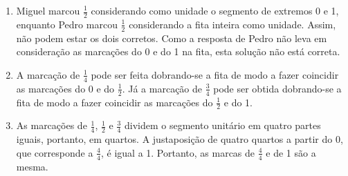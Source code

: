 \begin{atividade}
\solucao
\begin{enumerate}
    \item Miguel marcou $\frac{1}{2}$ considerando como unidade o segmento de extremos 0 e 1, enquanto Pedro marcou $\frac{1}{2}$ considerando a fita inteira como unidade. Assim, não podem estar os dois corretos. Como a resposta de Pedro não leva em consideração as marcações do 0 e do 1 na fita, esta solução não está correta.
\begin{center}
\end{center}
    \item       A marcação de       $\frac{1}{4}$       pode ser feita dobrando-se a fita de modo a fazer coincidir as marcações do 0 e do        $\frac{1}{2}$. Já a marcação de       $\frac{3}{4}$     pode ser obtida dobrando-se a fita de modo a fazer coincidir as marcações do       $\frac{1}{2}$       e do 1.

\begin{center}
\end{center}

    \item       As marcações de       $\frac{1}{4}$,        $\frac{1}{2}$       e       $\frac{3}{4}$       dividem o segmento unitário em quatro partes iguais, portanto, em quartos. A justaposição de quatro quartos a partir do 0, que corresponde a       $\frac{4}{4}$, é igual a 1.  Portanto, as marcas de       $\frac{4}{4}$       e de 1 são a mesma.

\begin{center}
\end{center}


\end{enumerate}
\end{atividade}
